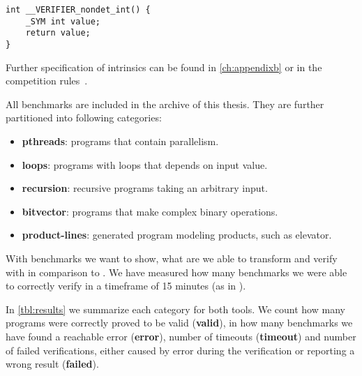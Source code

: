 \begin{verbatim}
int __VERIFIER_nondet_int() {
    _SYM int value;
    return value;
}
\end{verbatim}
Further specification of intrinsics can be found in \autoref{ch:appendixb} or in
the competition rules~\cite{svcomp}.

All benchmarks are included in the archive of this thesis. They are further
partitioned into following categories:
\begin{itemize}
    \item \textbf{pthreads}: programs that contain parallelism.
    \item \textbf{loops}: programs with loops that depends on input value.
    \item \textbf{recursion}: recursive programs taking an arbitrary input.
    \item \textbf{bitvector}: programs that make complex binary operations.
    \item \textbf{product-lines}: generated program modeling products, such as
        elevator.
\end{itemize}

With benchmarks we want to show, what are we able to transform and verify with \DIVINE in comparison to
\SymDIVINE. We have measured how many benchmarks we were able to correctly
verify in a timeframe of 15 minutes (as in \svcomp).

In \autoref{tbl:results} we summarize each category for both tools. We count how
many programs were correctly proved to be valid (\textbf{valid}), in how
many benchmarks we have found a reachable error (\textbf{error}), number of
timeouts (\textbf{timeout}) and number of failed verifications, either caused by
error during the verification or reporting a wrong result (\textbf{failed}).

